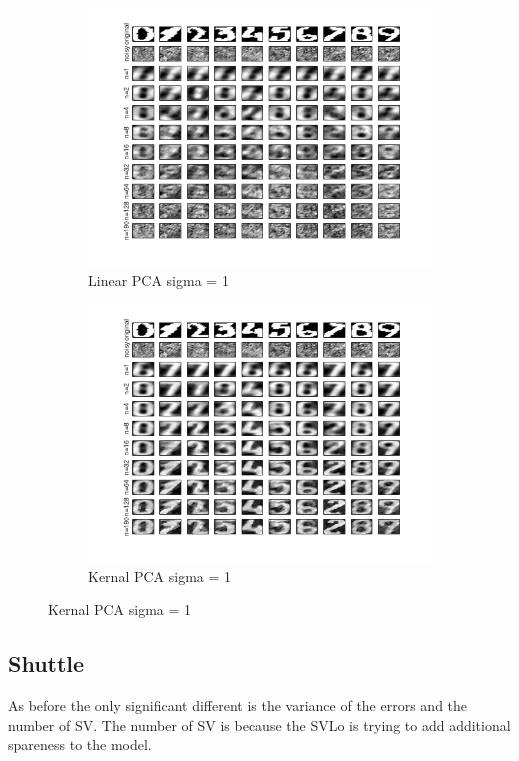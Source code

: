 \documentclass[11pt,oneside,a4paper]{article}
\begin{document}
{\begin{figure}[H]
\begin{subfigure}[b]{0.4\textwidth}
			\includegraphics[width=\textwidth]{../Figures/lin1}
			\caption{Linear PCA sigma = 1}
		\end{subfigure}
		\begin{subfigure}[b]{0.4\textwidth}
			\includegraphics[width=\textwidth]{../Figures/kern1}
			\caption{Kernal PCA sigma = 1}
		\end{subfigure}
	\end{figure}
	}

\subsection{Shuttle}

As before the only significant different is the variance of the errors and the number of SV. The number of SV is because the SVLo is trying to add additional spareness to the model.
\end{document}

